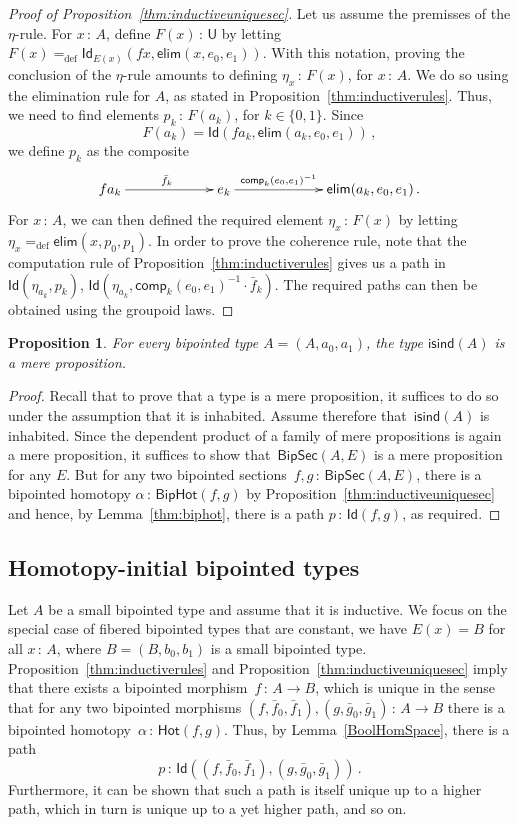 \documentclass[10pt,a4paper,oneside,reqno]{amsart}
\numberwithin{equation}{section}
\theoremstyle{mythm}
\newtheorem{proposition}[theorem]{Proposition}
\theoremstyle{mydef}
\theoremstyle{myrmk}
\newcommand{\ie}{\text{i.e.\ }}
\newcommand{\defeq}{=_{\mathrm{def}}}
\newcommand{\co}{\,{:}\,}
\newcommand{\ct}{\cdot}
\newcommand{\isbipind}{\mathsf{isind}}
\newcommand{\Hot}{\mathsf{Hot}}
\newcommand{\Id}{\mathsf{Id}}
\newcommand{\U}{\mathsf{U}}
\newcommand{\BipHot}{\mathsf{BipHot}}
\newcommand{\BipSec}{\mathsf{BipSec}}
\newcommand{\elim}{\mathsf{elim}}
\newcommand{\comp}{\mathsf{comp}}
\begin{document}
\begin{proof}[Proof of Proposition~\ref{thm:inductiveuniquesec}] Let us assume the premisses of the $\eta$-rule. For $x \co A$, define $F(x) \co \U$  by letting $F(x) \defeq 
\Id_{E(x)}(fx, \elim(x, e_0, e_1))$. 
With this notation, proving the conclusion of the $\eta$-rule amounts to defining
$\eta_x \co F(x)$, for $x \co A$. We do so using the elimination rule for $A$, as stated in Proposition~\ref{thm:inductiverules}.
Thus, we need to find elements $p_k \co F(a_k)$, for $k \in \{0, 1\}$. Since
\[
F(a_k) = \Id(fa_k, \elim(a_k, e_0, e_1)) \, ,
\]
we define $p_k$ as the composite
\[
\xymatrix@C=2.2cm{
 fa_k \ar[r]^{\bar{f}_k} &
 e_k \ar[r]^-{ \comp_k(e_0, e_1)^{-1}}& 
  \elim(a_k, e_0, e_1)  \, .}
\]
For $x \co A$, we can then defined the required element $\eta_x \co F(x)$ by letting $\eta_x \defeq \elim(x, p_0, p_1)$.
In order to prove the coherence rule, note that the computation rule of Proposition~\ref{thm:inductiverules} gives us a path in $\Id(\eta_{a_k},  p_k)$, \ie  $\Id( \eta_{a_k},  \comp_k(e_0, e_1)^{-1} \ct \bar{f}_k ) $. 
The required paths can then be obtained using the groupoid laws.
 \end{proof} 

\begin{proposition} \label{thm:isbipindisprop} For every bipointed type $A = (A, a_0, a_1)$, the type $\isbipind(A)$ is a mere proposition.
\end{proposition}

\begin{proof} Recall that to prove that a type  is a mere proposition, it suffices to do so under the assumption that it is inhabited. Assume therefore that~$\isbipind(A)$ is inhabited. Since the dependent product of a family of mere propositions is again a mere proposition, it suffices to show that~$\BipSec(A,E)$ is a mere proposition for any $E$. But for any two bipointed sections~$f, g \co \BipSec(A,E)$,  there is a 
bipointed homotopy $\alpha \co \BipHot(f,g)$ by Proposition~\ref{thm:inductiveuniquesec} and hence, by 
Lemma~\ref{thm:biphot}, there is a path $p \co \Id(f,g)$, as required. 
\end{proof} 


\subsection*{Homotopy-initial bipointed types} 
 Let $A$ be a small bipointed type and assume that it is inductive. 
 We focus on the special case of fibered bipointed types that 
are constant, \ie we have $E(x) = B$ for all $x \co A$, where $B = (B, b_0, b_1)$  is
a small bipointed type. 
 Proposition~\ref{thm:inductiverules} and Proposition~\ref{thm:inductiveuniquesec}
imply that there exists a bipointed morphism~$f \co A \to B$, which is unique in the sense that  for any two bipointed morphisms $(f, \bar{f}_0, \bar{f}_1), (g, \bar{g}_0, \bar{g}_1) \co A \to B$  there is a bipointed 
homotopy~$\alpha \co \Hot(f, g)$. Thus, by Lemma~\ref{BoolHomSpace}, there is a path 
\[
p \co \Id((f, \bar{f}_0, \bar{f}_1), (g, \bar{g}_0, \bar{g}_1)) \, .
\] 
Furthermore, it can be shown that such a path is itself unique up to a higher path, which in turn is unique up to a yet higher path, and so on. 
\end{document}
